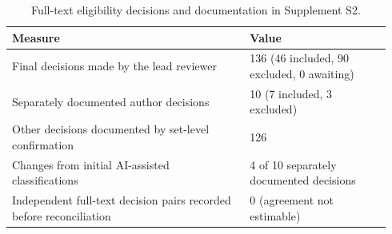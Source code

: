 \begin{table}[htbp]
\centering
\caption{Full-text eligibility decisions and documentation in Supplement S2.}
\label{tab:adjudication_audit}
\footnotesize
\begin{tabular}{@{}Y{0.59\linewidth}Y{0.35\linewidth}@{}}
\toprule
\textbf{Measure} & \textbf{Value} \\
\midrule
Final decisions made by the lead reviewer & 136 (46 included, 90 excluded, 0 awaiting) \\
Separately documented author decisions & 10 (7 included, 3 excluded) \\
Other decisions documented by set-level confirmation & 126 \\
Changes from initial AI-assisted classifications & 4 of 10 separately documented decisions \\
Independent full-text decision pairs recorded before reconciliation & 0 (agreement not estimable) \\
\bottomrule
\end{tabular}
\end{table}
